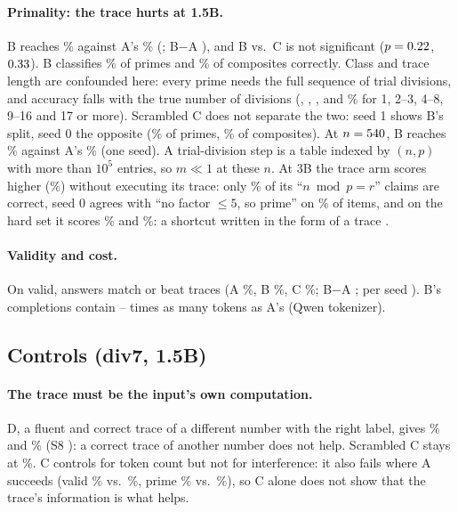 \documentclass{article}
\theoremstyle{definition}
\begin{document}
\paragraph{Primality: the trace hurts at 1.5B.} B reaches \primeB\% against A's \primeA\% (\primeBSeeds; B$-$A \primeBootBADiff{} \primeBootBACi), and B vs.\ C is not significant ($p=0.22$, $0.33$). B classifies \primeBprimesCorrect\% of primes and \primeBcompCorrect\% of composites correctly. Class and trace length are confounded here: every prime needs the full sequence of trial divisions, and accuracy falls with the true number of divisions (\primeBdivBinOne, \primeBdivBinTwo, \primeBdivBinThree, \primeBdivBinFour{} and \primeBdivBinFive\% for 1, 2--3, 4--8, 9--16 and 17 or more). Scrambled C does not separate the two: seed 1 shows B's split, seed 0 the opposite (\primeCsZeroPrimes\% of primes, \primeCsZeroComps\% of composites). At $n=540$, B reaches \primeBlarge\% against A's \primeAlarge\% (one seed). A trial-division step is a table indexed by $(n,p)$ with more than $10^5$ entries, so $m\ll1$ at these $n$. At 3B the trace arm scores higher (\threeBprimeB\%) without executing its trace: only \threeBprimeClaimAcc\% of its ``$n \bmod p = r$'' claims are correct, seed 0 agrees with ``no factor $\le 5$, so prime'' on \threeBprimeBnoFiveAgree\% of items, and on the hard set it scores \threeBprimeHardBsZero\% and \threeBprimeHardBsOne\%: a shortcut written in the form of a trace \citep[cf.][]{turpin2023unfaithful}.

\paragraph{Validity and cost.} On valid, answers match or beat traces (A \validA\%, B \validB\%, C \validC\%; B$-$A \validBootBADiff{} \validBootBACi; per seed \validBApList). B's completions contain \tokRatioLow--\tokRatioHigh{} times as many tokens as A's (Qwen tokenizer).

\subsection{Controls (div7, 1.5B)}
\label{sec:controls}
\paragraph{The trace must be the input's own computation.} D, a fluent and correct trace of a different number with the right label, gives \divsevenDsZero\% and \divsevenDsOne\% (S8 \verdictSEight): a correct trace of another number does not help. Scrambled C stays at \divsevenC\%. C controls for token count but not for interference: it also fails where A succeeds (valid \validC\% vs.\ \validA\%, prime \primeC\% vs.\ \primeA\%), so C alone does not show that the trace's information is what helps.
\end{document}

